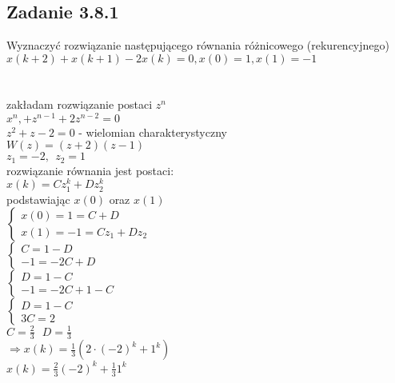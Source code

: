 \subsection*{Zadanie 3.8.1} {\color{darkgray}
	Wyznaczyć rozwiązanie następującego równania różnicowego (rekurencyjnego)\\
	$x(k+2)+x(k+1)-2x(k)=0, x(0)=1,x(1)=-1$\\
}\lineh
\\\\
zakładam rozwiązanie postaci $z^n$\\
$x^n, +z^{n-1}+2z^{n-2}=0$\\
$z^2+z-2=0$ - wielomian charakterystyczny\\
$W(z)=(z+2)(z-1)$\\
$z_1=-2, \ \ z_2=1$\\
rozwiązanie równania jest postaci:\\
$x(k)=Cz_1^k+Dz_2^k$\\
podstawiając $x(0)$ oraz $x(1)$\\
$\begin{cases} 
	x(0)=1=C+D \\
	x(1)=-1=Cz_1+Dz_2
\end{cases}$\\
$\begin{cases}
	 C=1-D \\
	-1=-2C+D
\end{cases}$\\
$\begin{cases}
	 D=1-C\\
	-1=-2C+1-C
\end{cases}$\\
$\begin{cases}
	 D=1-C\\
	3C=2
\end{cases}$\\
$C=\frac{2}{3} \ \ \ D=\frac{1}{3}$\\
$\Rightarrow x(k)=\frac{1}{3}(2 \cdot(-2)^k+1^k)$\\
$\boxed{x(k)=\frac{2}{3}(-2)^k+\frac{1}{3}1^k}$

\pagebreak
